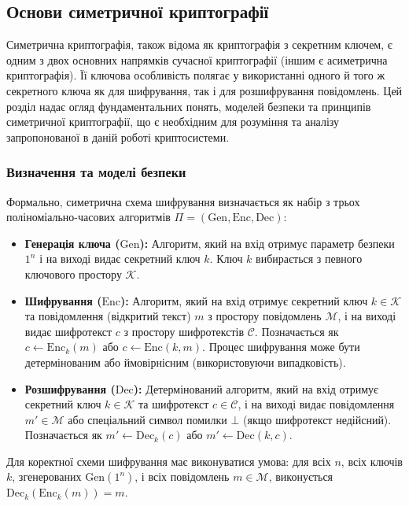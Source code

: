\documentclass[a4paper,12pt]{article}
\begin{document}
    \subsection{Основи симетричної криптографії} %
    Симетрична криптографія, також відома як криптографія з секретним ключем, є одним з двох основних напрямків сучасної криптографії (іншим є асиметрична криптографія). Її ключова особливість полягає у використанні одного й того ж секретного ключа як для шифрування, так і для розшифрування повідомлень. Цей розділ надає огляд фундаментальних понять, моделей безпеки та принципів симетричної криптографії, що є необхідним для розуміння та аналізу запропонованої в даній роботі криптосистеми.

    \subsubsection{Визначення та моделі безпеки} %
    Формально, симетрична схема шифрування визначається як набір з трьох поліноміально-часових алгоритмів \(\Pi = (\text{Gen}, \text{Enc}, \text{Dec})\):
    \begin{itemize}
        \item \textbf{Генерація ключа (\(\text{Gen}\)):} Алгоритм, який на вхід отримує параметр безпеки \(1^n\) і на виході видає секретний ключ \(k\). Ключ \(k\) вибирається з певного ключового простору \(\mathcal{K}\).
        \item \textbf{Шифрування (\(\text{Enc}\)):} Алгоритм, який на вхід отримує секретний ключ \(k \in \mathcal{K}\) та повідомлення (відкритий текст) \(m\) з простору повідомлень \(\mathcal{M}\), і на виході видає шифротекст \(c\) з простору шифротекстів \(\mathcal{C}\). Позначається як \(c \leftarrow \text{Enc}_k(m)\) або \(c \leftarrow \text{Enc}(k, m)\). Процес шифрування може бути детермінованим або ймовірнісним (використовуючи випадковість).
        \item \textbf{Розшифрування (\(\text{Dec}\)):} Детермінований алгоритм, який на вхід отримує секретний ключ \(k \in \mathcal{K}\) та шифротекст \(c \in \mathcal{C}\), і на виході видає повідомлення \(m' \in \mathcal{M}\) або спеціальний символ помилки \(\bot\) (якщо шифротекст недійсний). Позначається як \(m' \leftarrow \text{Dec}_k(c)\) або \(m' \leftarrow \text{Dec}(k, c)\).
    \end{itemize}
    Для коректної схеми шифрування має виконуватися умова: для всіх \(n\), всіх ключів \(k\), згенерованих \(\text{Gen}(1^n)\), і всіх повідомлень \(m \in \mathcal{M}\), виконується \(\text{Dec}_k(\text{Enc}_k(m)) = m\).
\end{document}
